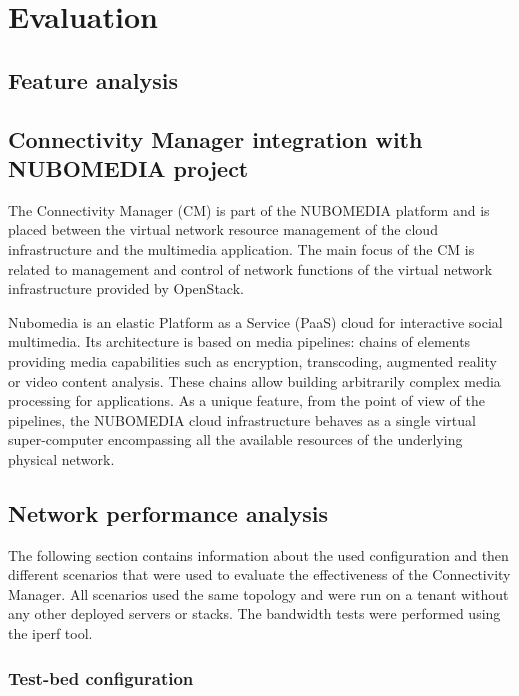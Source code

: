 \chapter{Evaluation}

\section{Feature analysis}



\section{Connectivity Manager integration with NUBOMEDIA project}


The Connectivity Manager (CM) is part of the NUBOMEDIA platform and is placed between the virtual network resource management of the cloud infrastructure and the
multimedia application. The main focus of the CM is related to management and control of network functions of the virtual network infrastructure provided by OpenStack.

Nubomedia is an elastic Platform as a Service (PaaS) cloud for interactive social multimedia. Its architecture is based on media pipelines: chains of elements providing media capabilities such as encryption, transcoding, augmented reality or video content analysis. These chains allow building arbitrarily complex media processing for applications. As a unique feature, from the point of view of the pipelines, the NUBOMEDIA cloud infrastructure behaves as a single virtual super-computer encompassing all the available resources of the underlying physical network.

\section{Network performance analysis}

The following section contains information about the used configuration and then different scenarios that were used to evaluate the effectiveness of the Connectivity Manager. All scenarios used the same topology and were run on a tenant without any other deployed servers or stacks. The bandwidth tests were performed using the iperf tool.

\subsection{Test-bed configuration}

